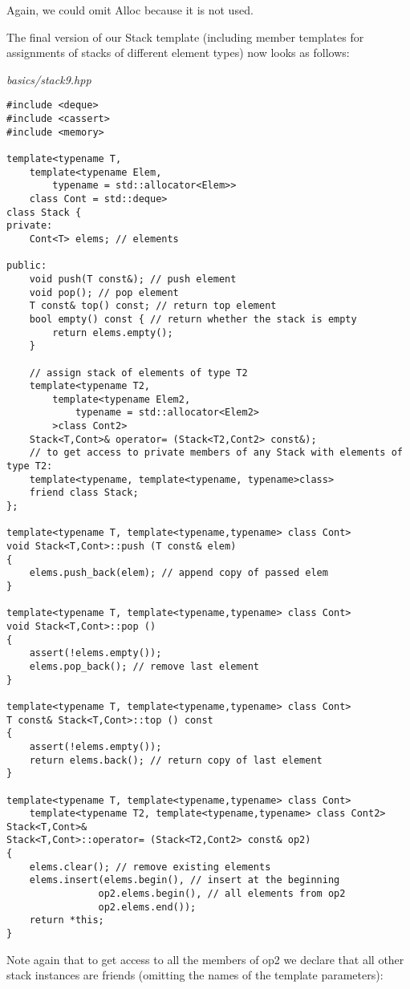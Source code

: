 Again, we could omit Alloc because it is not used.

The final version of our Stack template (including member templates for assignments of stacks of different element types) now looks as follows:

\noindent
\textit{basics/stack9.hpp}
\begin{lstlisting}[style=styleCXX]
#include <deque>
#include <cassert>
#include <memory>

template<typename T,
	template<typename Elem,
		typename = std::allocator<Elem>>
	class Cont = std::deque>
class Stack {
private:
	Cont<T> elems; // elements
	
public:
	void push(T const&); // push element
	void pop(); // pop element
	T const& top() const; // return top element
	bool empty() const { // return whether the stack is empty
		return elems.empty();
	}

	// assign stack of elements of type T2
	template<typename T2,
		template<typename Elem2,
			typename = std::allocator<Elem2>
		>class Cont2>
	Stack<T,Cont>& operator= (Stack<T2,Cont2> const&);
	// to get access to private members of any Stack with elements of type T2:
	template<typename, template<typename, typename>class>
	friend class Stack;
};

template<typename T, template<typename,typename> class Cont>
void Stack<T,Cont>::push (T const& elem)
{
	elems.push_back(elem); // append copy of passed elem
}

template<typename T, template<typename,typename> class Cont>
void Stack<T,Cont>::pop ()
{
	assert(!elems.empty());
	elems.pop_back(); // remove last element
}

template<typename T, template<typename,typename> class Cont>
T const& Stack<T,Cont>::top () const
{
	assert(!elems.empty());
	return elems.back(); // return copy of last element
}

template<typename T, template<typename,typename> class Cont>
	template<typename T2, template<typename,typename> class Cont2>
Stack<T,Cont>&
Stack<T,Cont>::operator= (Stack<T2,Cont2> const& op2)
{
	elems.clear(); // remove existing elements
	elems.insert(elems.begin(), // insert at the beginning
				op2.elems.begin(), // all elements from op2
				op2.elems.end());
	return *this;
}
\end{lstlisting}

Note again that to get access to all the members of op2 we declare that all other stack instances are friends (omitting the names of the template parameters):

